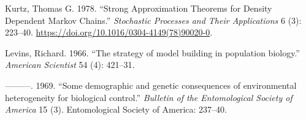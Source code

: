 \documentclass[3p]{elsarticle} %
\begin{document}
\leavevmode\hypertarget{ref-Kurtz1978}{}%
Kurtz, Thomas G. 1978. ``Strong Approximation Theorems for Density
Dependent Markov Chains.'' \emph{Stochastic Processes and Their
Applications} 6 (3): 223--40.
\url{https://doi.org/10.1016/0304-4149(78)90020-0}.

\leavevmode\hypertarget{ref-Levins1966}{}%
Levins, Richard. 1966. ``The strategy of model building in population
biology.'' \emph{American Scientist} 54 (4): 421--31.

\leavevmode\hypertarget{ref-Levins1969}{}%
---------. 1969. ``Some demographic and genetic consequences of
environmental heterogeneity for biological control.'' \emph{Bulletin of
the Entomological Society of America} 15 (3). Entomological Society of
America: 237--40.
\end{document}
